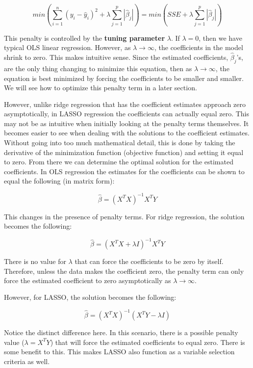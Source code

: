 \documentclass[
  letterpaper,
  DIV=11,
  numbers=noendperiod]{scrreprt}
\begin{document}
\[
min(\sum_{i=1}^n(y_i - \hat{y}_i)^2 + \lambda \sum_{j=1}^p |\hat{\beta}_j|) = min(SSE + \lambda \sum_{j=1}^p |\hat{\beta}_j|)
\]

This penalty is controlled by the \textbf{tuning parameter} \(\lambda\).
If \(\lambda = 0\), then we have typical OLS linear regression. However,
as \(\lambda \rightarrow \infty\), the coefficients in the model shrink
to zero. This makes intuitive sense. Since the estimated coefficients,
\(\hat{\beta}_j\)'s, are the only thing changing to minimize this
equation, then as \(\lambda \rightarrow \infty\), the equation is best
minimized by forcing the coefficients to be smaller and smaller. We will
see how to optimize this penalty term in a later section.

However, unlike ridge regression that has the coefficient estimates
approach zero asymptotically, in LASSO regression the coefficients can
actually equal zero. This may not be as intuitive when initially looking
at the penalty terms themselves. It becomes easier to see when dealing
with the solutions to the coefficient estimates. Without going into too
much mathematical detail, this is done by taking the derivative of the
minimization function (objective function) and setting it equal to zero.
From there we can determine the optimal solution for the estimated
coefficients. In OLS regression the estimates for the coefficients can
be shown to equal the following (in matrix form):

\[
\hat{\beta} = (X^TX)^{-1}X^TY
\]

This changes in the presence of penalty terms. For ridge regression, the
solution becomes the following:

\[
\hat{\beta} = (X^TX + \lambda I)^{-1}X^TY
\]

There is no value for \(\lambda\) that can force the coefficients to be
zero by itself. Therefore, unless the data makes the coefficient zero,
the penalty term can only force the estimated coefficient to zero
asymptotically as \(\lambda \rightarrow \infty\).

However, for LASSO, the solution becomes the following:

\[
\hat{\beta} = (X^TX)^{-1}(X^TY - \lambda I)
\]

Notice the distinct difference here. In this scenario, there is a
possible penalty value (\(\lambda = X^TY\)) that will force the
estimated coefficients to equal zero. There is some benefit to this.
This makes LASSO also function as a variable selection criteria as well.
\end{document}

